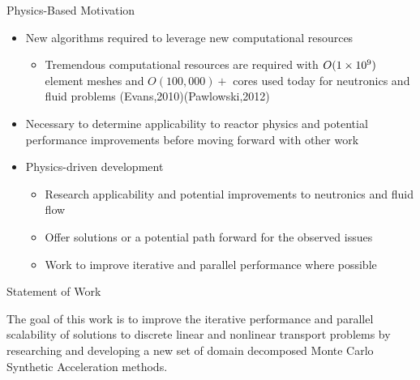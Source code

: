 \documentclass{beamer}
\begin{document}
\begin{frame}{Physics-Based Motivation}

  \begin{itemize}
  \item New algorithms required to leverage new computational
    resources
    \begin{itemize}
    \item Tremendous computational resources are required with
      $O(1\times 10^{9})$ element meshes and $O(100,000)+$ cores used today
      for neutronics and fluid problems (Evans,2010)(Pawlowski,2012)
    \end{itemize}
    \bigskip
  \item Necessary to determine applicability to reactor physics and
    potential performance improvements before moving forward with
    other work
    \bigskip
  \item Physics-driven development
    \begin{itemize}
    \item Research applicability and potential improvements to
      neutronics and fluid flow
    \item Offer solutions or a potential path forward for the observed
      issues
    \item Work to improve iterative and parallel performance where
      possible
    \end{itemize}
  \end{itemize}

\end{frame}

\begin{frame}{Statement of Work}

The goal of this work is to improve the iterative performance and
parallel scalability of solutions to discrete linear and nonlinear
transport problems by researching and developing a new set of domain
decomposed Monte Carlo Synthetic Acceleration methods.

\end{frame}
\end{document}
